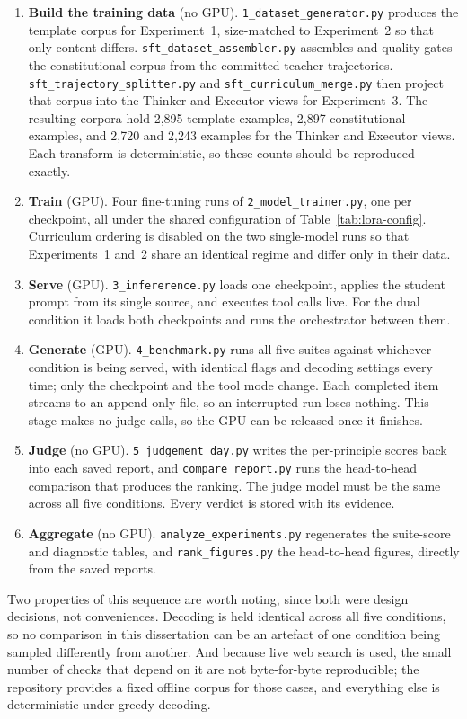 \begin{enumerate}
  \item \textbf{Build the training data} (no GPU). \texttt{1\_dataset\_generator.py} produces the template corpus for Experiment~1, size-matched to Experiment~2 so that only content differs. \texttt{sft\_dataset\_assembler.py} assembles and quality-gates the constitutional corpus from the committed teacher trajectories. \texttt{sft\_trajectory\_splitter.py} and \texttt{sft\_curriculum\_merge.py} then project that corpus into the Thinker and Executor views for Experiment~3. The resulting corpora hold 2,895 template examples, 2,897 constitutional examples, and 2,720 and 2,243 examples for the Thinker and Executor views. Each transform is deterministic, so these counts should be reproduced exactly.
  \item \textbf{Train} (GPU). Four fine-tuning runs of \texttt{2\_model\_trainer.py}, one per checkpoint, all under the shared configuration of Table~\ref{tab:lora-config}. Curriculum ordering is disabled on the two single-model runs so that Experiments~1 and~2 share an identical regime and differ only in their data.
  \item \textbf{Serve} (GPU). \texttt{3\_infererence.py} loads one checkpoint, applies the student prompt from its single source, and executes tool calls live. For the dual condition it loads both checkpoints and runs the orchestrator between them.
  \item \textbf{Generate} (GPU). \texttt{4\_benchmark.py} runs all five suites against whichever condition is being served, with identical flags and decoding settings every time; only the checkpoint and the tool mode change. Each completed item streams to an append-only file, so an interrupted run loses nothing. This stage makes no judge calls, so the GPU can be released once it finishes.
  \item \textbf{Judge} (no GPU). \texttt{5\_judgement\_day.py} writes the per-principle scores back into each saved report, and \texttt{compare\_report.py} runs the head-to-head comparison that produces the ranking. The judge model must be the same across all five conditions. Every verdict is stored with its evidence.
  \item \textbf{Aggregate} (no GPU). \texttt{analyze\_experiments.py} regenerates the suite-score and diagnostic tables, and \texttt{rank\_figures.py} the head-to-head figures, directly from the saved reports.
\end{enumerate}

Two properties of this sequence are worth noting, since both were design decisions, not conveniences. Decoding is held identical across all five conditions, so no comparison in this dissertation can be an artefact of one condition being sampled differently from another. And because live web search is used, the small number of checks that depend on it are not byte-for-byte reproducible; the repository provides a fixed offline corpus for those cases, and everything else is deterministic under greedy decoding.

